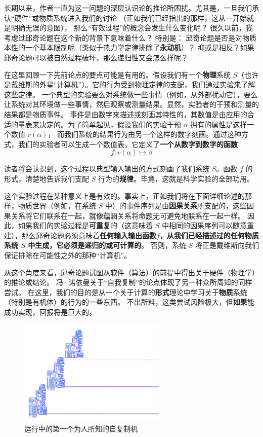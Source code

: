 \documentclass[a4paper,12pt]{article}
\begin{document}
长期以来，作者一直为这一问题的深层认识论的推论所困扰\cite{RosenR1962}。尤其是，一旦我们承认“硬件”或物质系统进入我们的讨论
（正如我们已经指出的那样，这从一开始就是明确无误的意图）， 那么“有效过程”的概念会发生什么变化呢？
很久以前\cite{RosenR1962}，我考虑过邱奇论题在这个新的背景下意味着什么？ 特别是：
邱奇论题是否是对物质本性的一个基本限制呢（类似于热力学定律排除了\textbf{永动机}）？
抑或是相反？如果邱奇论题可以被自然过程破坏，那么递归性又会怎么样呢？

在这里回顾一下先前论点的要点可能是有用的。假设我们有一个\textbf{物理}系统 $S$（也许是戴维斯的外星“计算机”）。它的行为受到物理定律的支配，我们通过实验来了解这些定律。
一个典型的实验要么对系统做一些事情（例如，从外部扰动它），要么让系统对其环境做一些事情，然后观察或测量结果。显然，实验者的干预和测量的结果都是物质事件。
事件是由数字来描述或刻画其特性的，其数值是由应用的合适的量表来决定的\cite{RosenR1978}。为了简单起见，假设我们的实验干预 $\alpha$ 拥有的属性是这样一个数值 $r(\alpha)$，
而我们系统的结果行为由另一个这样的数字刻画。通过这种方式，我们的实验者可以生成一个数值表，它定义了\textbf{一个从数字到数字的函数}  \begin{equation}\label{eq:1} f: r(\alpha) \mapsto \beta\end{equation}

读者将会认识到，这个过程以典型输入输出的方式刻画了我们系统 $S$。函数 $f$ 的形式，清楚地告诉我们支配 $S$ 行为的\textbf{规律}。毕竟，这就是科学实验的全部功用。

这个实验过程在某种意义上是有效的。事实上，正如我们将在下面详细论述的那样，物质世界（例如，在系统 $S$ 中）的事件序列是由\textbf{因果关系}所支配的，这些因果关系将它们联系在一起，就像蕴涵关系将命题无可避免地联系在一起一样。
因此，如果我们的实验过程是\textbf{可重复}的（这意味着 $S$ 中相同的因果序列可以随意重建），那么邱奇论题必须意味着\textbf{任何输入输出函数\hyperref[eq:1]{$f$}，从我们已经描述过的任何物质系统 $S$ 中生成，它必须是递归的或可计算的}。
否则，系统 $S$ 将正是戴维斯向我们保证排除在可能性之外的那种“计算机”。

从这个角度来看，邱奇论题试图从软件（算法）的前提中得出关于硬件（物理学）的推论或结论。
冯·诺依曼关于“自我复制”的论点\cite{BurksA1966}体现了另一种众所周知的同样尝试。
在这里，我们的目的是从一个关于计算的\textbf{形式}理论中学习关于\textbf{物质}系统（特别是有机体）的行为的一些东西。
不出所料，这类尝试风险极大，但\textbf{如果}能成功实现，回报将是巨大的。

\begin{figure}[ht]
\centering
\includegraphics[height=2.0in]{images/self_reprod.png}
\caption{运行中的第一个为人所知的自复制机}
\end{figure}
\end{document}
